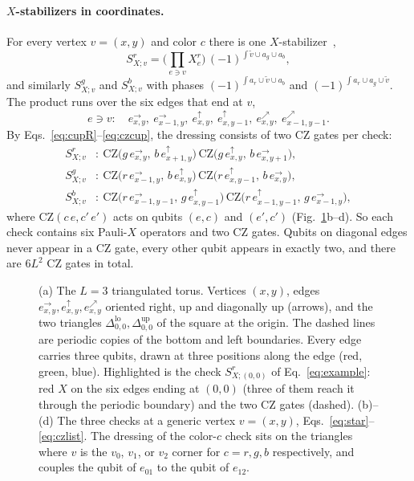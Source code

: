 \documentclass[a4paper]{article}
\newcommand{\rd}{r}
\newcommand{\gr}{g}
\newcommand{\bl}{b}
\newcommand{\eh}[1]{e^{\rightarrow}_{#1}}   %
\newcommand{\ev}[1]{e^{\uparrow}_{#1}}      %
\newcommand{\ed}[1]{e^{\nearrow}_{#1}}      %
\newcommand{\tlo}[1]{\Delta^{\mathrm{lo}}_{#1}}
\newcommand{\tup}[1]{\Delta^{\mathrm{up}}_{#1}}
\begin{document}
\paragraph{$X$-stabilizers in coordinates.}
For every vertex $v=(x,y)$ and color $c$ there is one $X$-stabilizer~\cite{kobayashi2025clifford},
\begin{equation}
  S^{\rd}_{X;v}=\Big(\prod_{e\ni v}X^{\rd}_e\Big)\,(-1)^{\int \tilde v\cup a_\gr\cup a_\bl},
  \label{eq:xstab}
\end{equation}
and similarly $S^{\gr}_{X;v}$ and $S^{\bl}_{X;v}$ with phases $(-1)^{\int a_\rd\cup\tilde v\cup a_\bl}$ and $(-1)^{\int a_\rd\cup a_\gr\cup\tilde v}$. The product runs over the six edges that end at $v$,
\begin{equation}
  e\ni v:\quad \eh{x,y},\ \eh{x-1,y},\ \ev{x,y},\ \ev{x,y-1},\ \ed{x,y},\ \ed{x-1,y-1}.
  \label{eq:star}
\end{equation}
By Eqs.~\eqref{eq:cupR}--\eqref{eq:czcup}, the dressing consists of two CZ gates per check:
\begin{align}
  S^\rd_{X;v}&:\ \mathrm{CZ}\big(\gr\,\eh{x,y},\,\bl\,\ev{x+1,y}\big)\,\mathrm{CZ}\big(\gr\,\ev{x,y},\,\bl\,\eh{x,y+1}\big),\nonumber\\
  S^\gr_{X;v}&:\ \mathrm{CZ}\big(\rd\,\eh{x-1,y},\,\bl\,\ev{x,y}\big)\,\mathrm{CZ}\big(\rd\,\ev{x,y-1},\,\bl\,\eh{x,y}\big),\label{eq:czlist}\\
  S^\bl_{X;v}&:\ \mathrm{CZ}\big(\rd\,\eh{x-1,y-1},\,\gr\,\ev{x,y-1}\big)\,\mathrm{CZ}\big(\rd\,\ev{x-1,y-1},\,\gr\,\eh{x-1,y}\big),\nonumber
\end{align}
where $\mathrm{CZ}(c\,e,c'\,e')$ acts on qubits $(e,c)$ and $(e',c')$ (Fig.~\ref{fig:lattice}b--d). So each check contains six Pauli-$X$ operators and two CZ gates. Qubits on diagonal edges never appear in a CZ gate, every other qubit appears in exactly two, and there are $6L^2$ CZ gates in total.

\begin{figure}[t]
\centering

\caption{(a) The $L=3$ triangulated torus. Vertices $(x,y)$, edges $\eh{x,y},\ev{x,y},\ed{x,y}$ oriented right, up and diagonally up (arrows), and the two triangles $\tlo{0,0},\tup{0,0}$ of the square at the origin. The dashed lines are periodic copies of the bottom and left boundaries. Every edge carries three qubits, drawn at three positions along the edge (red, green, blue). Highlighted is the check $S^\rd_{X;(0,0)}$ of Eq.~\eqref{eq:example}: red $X$ on the six edges ending at $(0,0)$ (three of them reach it through the periodic boundary) and the two CZ gates (dashed). (b)--(d) The three checks at a generic vertex $v=(x,y)$, Eqs.~\eqref{eq:star}--\eqref{eq:czlist}. The dressing of the color-$c$ check sits on the triangles where $v$ is the $v_0$, $v_1$, or $v_2$ corner for $c=\rd,\gr,\bl$ respectively, and couples the qubit of $e_{01}$ to the qubit of $e_{12}$.}
\label{fig:lattice}
\end{figure}
\end{document}
